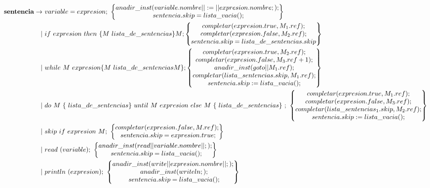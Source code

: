 \documentclass[12pt,a4paper,landscape]{article}
\theoremstyle{mytheor}
\begin{document}
\begin{alignat*}{2}
  \text{\textbf{sentencia}} \to\ & variable = expresion;\ \begin{Bmatrix} anadir\_inst(variable.nombre||:=||expresion.nombre;);\\ sentencia.skip=lista\_vacia();\end{Bmatrix}\\
 |\ &if\ expresion\ then\ \{M\ lista\_de\_sentencias\}M; \begin{Bmatrix} completar(expresion.true,M_1.ref); \\ completar(expresion.false,M_2.ref);\\ sentencia.skip=lista\_de\_sentencias.skip \end{Bmatrix} \\
 |\ &while\ M\ expresion \{M\ lista\_de\_sentencias M\}; \begin{Bmatrix} completar(expresion.true,M_2.ref); \\ completar(expresion.false,M_3.ref+1);\\ anadir\_inst(goto||M_1.ref);\\completar(lista\_sentencias.skip,M_1.ref);\\sentencia.skip:=lista\_vacia(); \end{Bmatrix} \\
 |\ &do\ M\ \{\ lista\_de\_sentencias \}\ until\ M\ expresion\ else\ M\ \{\ lista\_de\_sentencias\}\ ;\ \begin{Bmatrix} completar(expresion.true,M_1.ref); \\ completar(expresion.false,M_3.ref);\\ completar(lista\_sentencias_1.skip,M_2.ref);\\sentencia.skip:=lista\_vacia(); \end{Bmatrix} \\
 |\ &skip\ if\ expresion\ M;\ \begin{Bmatrix} completar(expresion.false,M.ref); \\ sentencia.skip =expresion.true; \end{Bmatrix}\\
 |\ &read\ (variable);\ \begin{Bmatrix} anadir\_inst(read||variable.nombre||;);\\ sentencia.skip=lista\_vacia();\end{Bmatrix}\\
 |\ &println \ (expresion);\  \begin{Bmatrix} anadir\_inst(write||expresion.nombre||;); \\ anadir\_inst(writeln;); \\ sentencia.skip=lista\_vacia(); \end{Bmatrix}\\
\end{alignat*}
\end{document}
